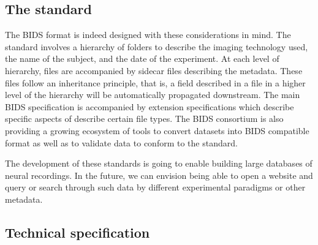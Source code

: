\subsection{The standard}
The BIDS format is indeed designed with these considerations in mind. The standard involves a hierarchy of folders to describe the imaging technology used, the name of the subject, and the date of the experiment. At each level of hierarchy, files are accompanied by sidecar  files describing the metadata. These files follow an inheritance principle, that is, a field described in a  file in a higher level of the hierarchy will be automatically propagated downstream. The main BIDS specification is accompanied by extension specifications which describe specific aspects of describe certain file types. The BIDS consortium is also providing a growing ecosystem of tools to convert datasets into BIDS compatible format as well as to validate data to conform to the standard. 

The development of these standards is going to enable building large databases of neural recordings. In the future, we can envision being able to open a website and query or search through such data by different experimental paradigms or other metadata.

\noindent{}%

\subsection{Technical specification}
\label{sec:BIDS-MEG}

